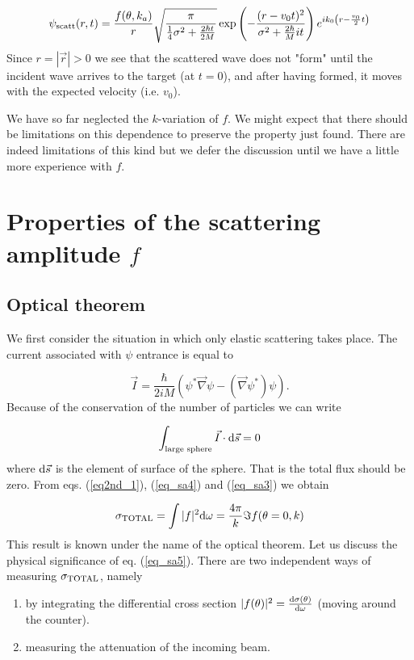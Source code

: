 \begin{equation}
\psi_{\rm scatt}(r,t) = \frac{f(\theta, k_a)}{r} \sqrt{\frac{\pi}{\frac{1}{4} \sigma^2 + \frac{2 \hbar t}{2M}}} \exp\left(- \frac{(r-v_0 t)^2}{\sigma^2 + \frac{2 \hbar}{M} i t}\right) e^{i k_0 \left( r- \frac{v_0}{2} t \right)}
\end{equation}
Since $r = |\vec{r}| > 0$ we see that the scattered wave does not "form" until the incident wave arrives to the target (at $t=0$), and after having formed, it moves with the expected velocity (i.e. $v_0$).

We have so far neglected the $k$-variation of $f$. We might expect that there should be limitations on this dependence to preserve the property just found. There are indeed limitations of this kind but we defer the discussion until we have a little more experience with $f$.


\section{Properties of the scattering amplitude $f$}

\subsection{Optical theorem}

We first consider the situation in which only elastic scattering takes place. The current associated with $\psi$ entrance is equal to

\begin{equation}\label{eq_sa4}
\vec{I} = \frac{\hbar}{2iM} \left( \psi^* \vec{\nabla} \psi - \left( \vec{\nabla} \psi^* \right) \psi \right).
\end{equation}
Because of the conservation of the number of particles we can write

\begin{equation}\label{eq_sa3}
\int_{\text{large sphere}} \vec{I} \cdot {\rm d}\vec{s} = 0
\end{equation}
where ${\rm d}\vec{s}$ is the element of surface of the sphere. That is the total flux should be zero. From eqs. (\ref{eq2nd_1}), (\ref{eq_sa4}) and (\ref{eq_sa3}) we obtain

\begin{equation}\label{eq_sa5}
\sigma_{\rm TOTAL} = \int |f|^2 {\rm d}\omega = \frac{4\pi}{k} \Im f(\theta=0,k)
\end{equation}
This result is known under the name of the optical theorem. Let us discuss the physical significance of eq. (\ref{eq_sa5}).
There are two independent ways of measuring $\sigma_{\rm TOTAL}$, namely
\begin{enumerate}
\item{by integrating the differential cross section $|f(\theta)|^2 = \frac{{\rm d}\sigma(\theta)}{{\rm d}\omega}$ (moving around the counter).}
\item{measuring the attenuation of the incoming beam.}
\end{enumerate}

